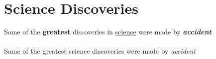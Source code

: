 \documentclass{article}
\begin{document}
		\section{Science Discoveries}
			Some of the \textbf{greatest} discoveries in \underline{science} were made by \textbf{\textit{accident}}
		\paragraph{}
			Some of the greatest science discoveries were made by \emph{accident}
	
\end{document}
